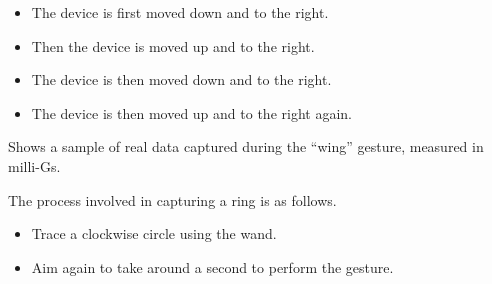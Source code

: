 \vspace{5mm}
\begin{center}
\end{center}
\begin{itemize}
	\item The device is first moved down and to the right.
	\item Then the device is moved up and to the right.
	\item The device is then moved down and to the right.
	\item The device is then moved up and to the right again. 
	
\end{itemize}

	Shows a sample of real data captured during the ``wing'' gesture, measured in milli-Gs.  

	The process involved in capturing a ring is as follows. \cite{War:2020}

\begin{center}
\end{center}

\begin{itemize}
	\item Trace a clockwise circle using the wand.
	
	\item Aim again to take around a second to perform the gesture.
	
\end{itemize}

